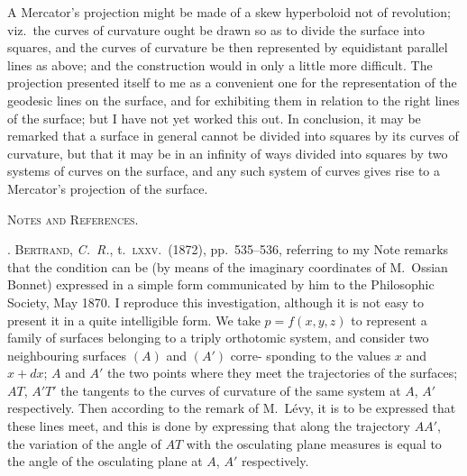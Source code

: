 \documentclass[11pt,a4paper]{book}
\begin{document}
\bigskip

A Mercator's projection might be made of a skew hyperboloid not of revolution;
viz.\ the curves of curvature ought be drawn so as to divide the surface into squares,
and the curves of curvature be then represented by equidistant parallel lines as above;
and the construction would in only a little more difficult.  The projection presented
itself to me as a convenient one for the representation of the geodesic lines on the
surface, and for exhibiting them in relation to the right lines of the surface; but I
have not yet worked this out.  In conclusion, it may be remarked that a surface in
general cannot be divided into squares by its curves of curvature, but that it may
be in an infinity of ways divided into squares by two systems of curves on the
surface, and any such system of curves gives rise to a Mercator's projection of the
surface.

\clearpage


\vspace*{2em}
\begin{center}
{\Large\scshape Notes and References.}
\end{center}
\vspace{1em}

. \textsc{Bertrand}, \textit{C.~R.}, t.~\textsc{lxxv}.\ (1872), pp.~535--536, referring to my Note remarks
that the condition can be (by means of the imaginary coordinates of M.~Ossian Bonnet)
expressed in a simple form communicated by him to the Philosophic Society, May
1870.  I reproduce this investigation, although it is not easy to present it in a quite
intelligible form.  We take $p=f(x,y,z)$ to represent a family of surfaces belonging to
a triply orthotomic system, and consider two neighbouring surfaces $(A)$ and $(A')$ corre-
sponding to the values $x$ and $x+dx$; $A$ and $A'$ the two points where they meet the
trajectories of the surfaces; $AT$, $A'T'$ the tangents to the curves of curvature of the
same system at $A$, $A'$ respectively.  Then according to the remark of M.~L\'evy, it is
to be expressed that these lines meet, and this is done by expressing that along the
trajectory $AA'$, the variation of the angle of $AT$ with the osculating plane measures
is equal to the angle of the osculating plane at $A$, $A'$ respectively.
\end{document}
